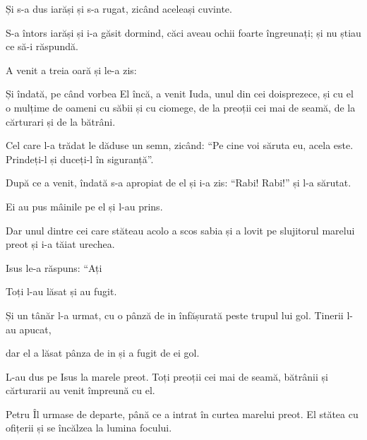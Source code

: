 {\par }{\PP {}Și s-a dus iarăși și s-a rugat, zicând aceleași cuvinte.

S-a întors iarăși și i-a găsit dormind, căci aveau ochii foarte îngreunați; și nu știau ce să-i răspundă.

A venit a treia oară și le-a zis:
{}



\par }{\PP {}Și îndată, pe când vorbea El încă, a venit Iuda, unul din cei doisprezece, și cu el o mulțime de oameni cu săbii și cu ciomege, de la preoții cei mai de seamă, de la cărturari și de la bătrâni.

Cel care l-a trădat le dăduse un semn, zicând: “Pe cine voi săruta eu, acela este. Prindeți-l și duceți-l în siguranță”.

După ce a venit, îndată s-a apropiat de el și i-a zis: “Rabi! Rabi!” și l-a sărutat.

Ei au pus mâinile pe el și l-au prins.

Dar unul dintre cei care stăteau acolo a scos sabia și a lovit pe slujitorul marelui preot și i-a tăiat urechea.


\par }{\PP {}Isus le-a răspuns: “Ați
{}



\par }{\PP {}Toți l-au lăsat și au fugit.

Și un tânăr l-a urmat, cu o pânză de in înfășurată peste trupul lui gol. Tinerii l-au apucat,

dar el a lăsat pânza de in și a fugit de ei gol.

L-au dus pe Isus la marele preot. Toți preoții cei mai de seamă, bătrânii și cărturarii au venit împreună cu el.


\par }{\PP {}Petru Îl urmase de departe, până ce a intrat în curtea marelui preot. El stătea cu ofițerii și se încălzea la lumina focului.

}
